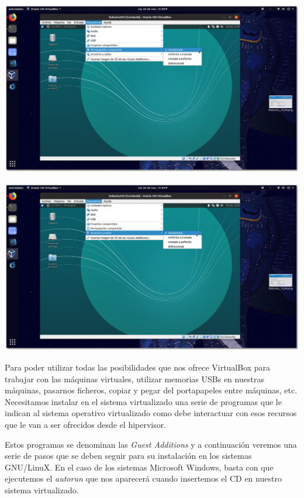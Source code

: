 \documentclass[11pt]{article}
\begin{document}
\begin{center}
\includegraphics[width=.9\linewidth]{imgs/VBox_GuestAdd_LinuX_007.png}
\end{center}

\begin{center}
\includegraphics[width=.9\linewidth]{imgs/VBox_GuestAdd_LinuX_009.png}
\end{center}

Para poder utilizar todas las posibilidades que nos ofrece VirtualBox
para trabajar con las máquinas virtuales, utilizar memorias USBs en
nuestras máquinas, pasarnos ficheros, copiar y pegar del portapapeles
entre máquinas, etc. Necesitamos instalar en el sistema virtualizado una
serie de programas que le indican al sistema operativo virtualizado como
debe interactuar con esos recursos que le van a ser ofrecidos desde el
hipervisor.

Estos programas se denominan las \emph{Guest Additions} y a continuación
veremos una serie de pasos que se deben seguir para su instalación en
los sistemas GNU/LinuX. En el caso de los sistemas Microsoft Windows,
basta con que ejecutemos el \emph{autorun} que nos aparecerá cuando
insertemos el CD en nuestro sistema virtualizado.
\end{document}
